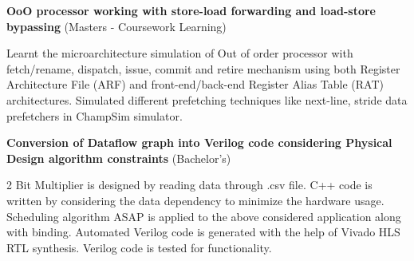 \documentclass[letterpaper,11pt]{article}
\begin{document}
\begin{itemize}[leftmargin=0in, label={}]
{{    \newpage 
    \textbf{OoO processor working with store-load forwarding and load-store bypassing} \hspace{\fill} (Masters - Coursework Learning)
     \vspace{-10 pt}
     \begin{justify} Learnt the microarchitecture simulation of Out of order processor with fetch/rename, dispatch, issue, commit and retire mechanism using both Register Architecture File (ARF) and front-end/back-end Register Alias Table (RAT) architectures. Simulated different prefetching techniques like next-line, stride data prefetchers in ChampSim simulator.
     \end{justify} 
     \vspace{1 pt}
     
     \textbf{Conversion of Dataflow graph into Verilog code considering Physical Design algorithm constraints} \hspace{\fill} (Bachelor's)
     \vspace{-10 pt} 
     \begin{justify} 2 Bit Multiplier is designed by reading data through .csv file. C++ code is written by considering the data dependency to minimize the hardware usage. Scheduling algorithm ASAP is applied to the above considered application along with binding. Automated Verilog code is generated with the help of Vivado HLS RTL synthesis. Verilog code is tested for functionality.
     \end{justify} 
     \vspace{1 pt}
    

    }}
 \end{itemize}
\vspace{-12pt}



    
\end{document}
